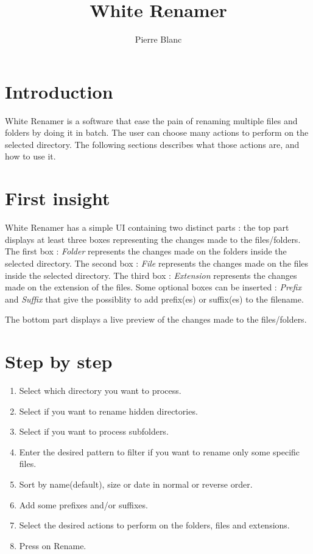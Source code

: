 \documentclass[12pt, a4paper]{scrartcl}
\title{\vspace{-15px}\textbf{White Renamer}}
\date{}
\author{Pierre Blanc}
\begin{document}
\maketitle
\setlength{\parindent}{0pt}
\setlength{\parskip}{12pt}
\section{Introduction}
White Renamer is a software that ease the pain of renaming multiple files and folders by doing it in batch. The user can choose many actions to perform on the selected directory. The following sections describes what those actions are, and how to use it.

\section{First insight}
White Renamer has a simple UI containing two distinct parts : the top part displays at least three boxes representing the changes made to the files/folders. The first box : \emph{Folder} represents the changes made on the folders inside the selected directory.
The second box : \emph{File} represents the changes made on the files inside the selected directory.
The third box : \emph{Extension} represents the changes made on the extension of the files.
Some optional boxes can be inserted : \emph{Prefix} and \emph{Suffix} that give the possiblity to add prefix(es) or suffix(es) to the filename.

The bottom part displays a live preview of the changes made to the files/folders.

\section{Step by step}
\begin{enumerate}
       \item Select which directory you want to process.
       \item Select if you want to rename hidden directories.
       \item Select if you want to process subfolders.
       \item Enter the desired pattern to filter if you want to rename only some specific files.
       \item Sort by name(default), size or date in normal or reverse order.
       \item Add some prefixes and/or suffixes.
       \item Select the desired actions to perform on the folders, files and extensions.
       \item Press on Rename.
\end{enumerate}
\end{document}
